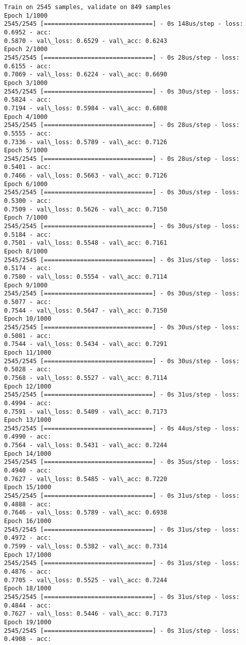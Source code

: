 \documentclass[11pt]{article}
\begin{document}
\begin{Verbatim}[commandchars=\\\{\}]
Train on 2545 samples, validate on 849 samples
Epoch 1/1000
2545/2545 [==============================] - 0s 148us/step - loss: 0.6952 - acc:
0.5870 - val\_loss: 0.6529 - val\_acc: 0.6243
Epoch 2/1000
2545/2545 [==============================] - 0s 28us/step - loss: 0.6155 - acc:
0.7069 - val\_loss: 0.6224 - val\_acc: 0.6690
Epoch 3/1000
2545/2545 [==============================] - 0s 30us/step - loss: 0.5824 - acc:
0.7194 - val\_loss: 0.5984 - val\_acc: 0.6808
Epoch 4/1000
2545/2545 [==============================] - 0s 28us/step - loss: 0.5555 - acc:
0.7336 - val\_loss: 0.5789 - val\_acc: 0.7126
Epoch 5/1000
2545/2545 [==============================] - 0s 28us/step - loss: 0.5401 - acc:
0.7466 - val\_loss: 0.5663 - val\_acc: 0.7126
Epoch 6/1000
2545/2545 [==============================] - 0s 30us/step - loss: 0.5300 - acc:
0.7509 - val\_loss: 0.5626 - val\_acc: 0.7150
Epoch 7/1000
2545/2545 [==============================] - 0s 30us/step - loss: 0.5184 - acc:
0.7501 - val\_loss: 0.5548 - val\_acc: 0.7161
Epoch 8/1000
2545/2545 [==============================] - 0s 31us/step - loss: 0.5174 - acc:
0.7580 - val\_loss: 0.5554 - val\_acc: 0.7114
Epoch 9/1000
2545/2545 [==============================] - 0s 30us/step - loss: 0.5077 - acc:
0.7544 - val\_loss: 0.5647 - val\_acc: 0.7150
Epoch 10/1000
2545/2545 [==============================] - 0s 30us/step - loss: 0.5081 - acc:
0.7544 - val\_loss: 0.5434 - val\_acc: 0.7291
Epoch 11/1000
2545/2545 [==============================] - 0s 30us/step - loss: 0.5028 - acc:
0.7568 - val\_loss: 0.5527 - val\_acc: 0.7114
Epoch 12/1000
2545/2545 [==============================] - 0s 31us/step - loss: 0.4994 - acc:
0.7591 - val\_loss: 0.5409 - val\_acc: 0.7173
Epoch 13/1000
2545/2545 [==============================] - 0s 44us/step - loss: 0.4990 - acc:
0.7564 - val\_loss: 0.5431 - val\_acc: 0.7244
Epoch 14/1000
2545/2545 [==============================] - 0s 35us/step - loss: 0.4940 - acc:
0.7627 - val\_loss: 0.5485 - val\_acc: 0.7220
Epoch 15/1000
2545/2545 [==============================] - 0s 31us/step - loss: 0.4888 - acc:
0.7646 - val\_loss: 0.5789 - val\_acc: 0.6938
Epoch 16/1000
2545/2545 [==============================] - 0s 31us/step - loss: 0.4972 - acc:
0.7599 - val\_loss: 0.5382 - val\_acc: 0.7314
Epoch 17/1000
2545/2545 [==============================] - 0s 31us/step - loss: 0.4876 - acc:
0.7705 - val\_loss: 0.5525 - val\_acc: 0.7244
Epoch 18/1000
2545/2545 [==============================] - 0s 31us/step - loss: 0.4844 - acc:
0.7627 - val\_loss: 0.5446 - val\_acc: 0.7173
Epoch 19/1000
2545/2545 [==============================] - 0s 31us/step - loss: 0.4908 - acc:

\end{Verbatim}
\end{document}
